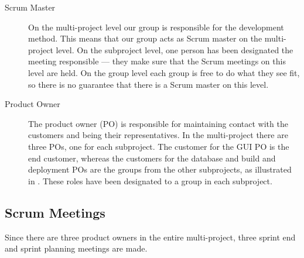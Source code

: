 \begin{description}
  \item[Scrum Master] On the multi-project level our group is responsible for the development method. This means that our group acts as Scrum master on the multi-project level. On the subproject level, one person has been designated the meeting responsible --- they make sure that the Scrum meetings on this level are held. On the group level each group is free to do what they see fit, so there is no guarantee that there is a Scrum master on this level.
  \item[Product Owner] The product owner (PO) is responsible for maintaining contact with the customers and being their representatives. In the multi-project there are three POs, one for each subproject. The customer for the GUI PO is the end customer, whereas the customers for the database and build and deployment POs are the groups from the other subprojects, as illustrated in . These roles have been designated to a group in each subproject.
\end{description}


\subsection{Scrum Meetings}

Since there are three product owners in the entire multi-project, three sprint end and sprint planning meetings are made.

